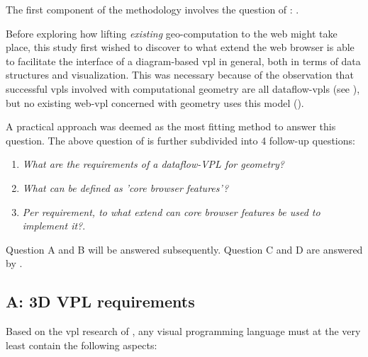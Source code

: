 The first component of the methodology involves the question of \mySubRQOneTitle : \mySubRQOne.

Before exploring how lifting \emph{existing} geo-computation to the web might take place, this study first wished to discover to what extend the web browser is able to facilitate the interface of a diagram-based vpl in general, both in terms of data structures and visualization. 
This was necessary because of the observation that successful vpls involved with computational geometry are all dataflow-vpls (see ), but no existing web-vpl concerned with geometry uses this model ().

A practical approach was deemed as the most fitting method to answer this question.
The above question of \mySubRQOneTitle is further subdivided into 4 follow-up questions:
\begin{enumerate}[A]
  \item \emph{What are the requirements of a dataflow-VPL for geometry?}
  \item \emph{What can be defined as 'core browser features'?}
  \item \emph{Per requirement, to what extend can core browser features be used to implement it?}.
\end{enumerate}

Question A and B will be answered subsequently. 
Question C and D are answered by .

\subsection*{A: 3D VPL requirements}

Based on the vpl research of , any visual programming language must at the very least contain the following aspects: 

